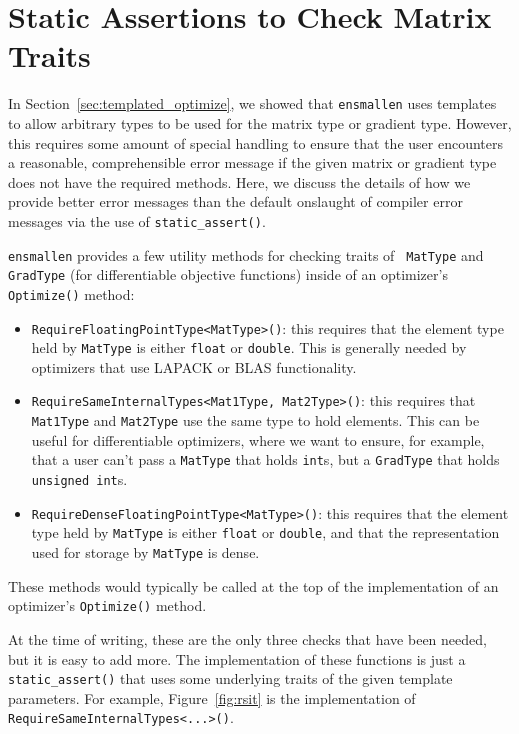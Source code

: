 \section{Static Assertions to Check Matrix Traits}
\label{sec:templated_optimize_details}

In Section~\ref{sec:templated_optimize}, we showed that {\tt ensmallen} uses
templates to allow arbitrary types to be used for the matrix type or gradient
type.  However, this requires some amount of special handling to ensure that the
user encounters a reasonable, comprehensible error message if the given matrix
or gradient type does not have the required methods.  Here, we discuss the
details of how we provide better error messages than the default onslaught of
compiler error messages via the use of {\tt static\_assert()}.

{\tt ensmallen} provides a few utility methods for checking traits of {\tt
MatType} and {\tt GradType} (for differentiable objective functions) inside of
an optimizer's {\tt Optimize()} method:

\begin{itemize}
  \item {\tt RequireFloatingPointType<MatType>()}: this requires that the
element type held by {\tt MatType} is either {\tt float} or {\tt double}.
This is generally needed by optimizers that use LAPACK or BLAS functionality.

  \item {\tt RequireSameInternalTypes<Mat1Type, Mat2Type>()}: this requires that
{\tt Mat1Type} and {\tt Mat2Type} use the same type to hold elements.  This can
be useful for differentiable optimizers, where we want to ensure, for example,
that a user can't pass a {\tt MatType} that holds {\tt int}s, but a {\tt GradType} that
holds {\tt unsigned int}s.

  \item {\tt RequireDenseFloatingPointType<MatType>()}: this requires that the
element type held by {\tt MatType} is either {\tt float} or {\tt double}, and
that the representation used for storage by {\tt MatType} is dense.
\end{itemize}

These methods would typically be called at the top of the implementation of an
optimizer's {\tt Optimize()} method.

At the time of writing, these are the only three checks that have
been needed, but it is easy to add more.  The implementation of these functions
is just a {\tt static\_assert()} that uses some underlying traits of the given
template parameters.  For example, Figure~\ref{fig:rsit} is the implementation
of {\tt RequireSameInternalTypes<...>()}.

